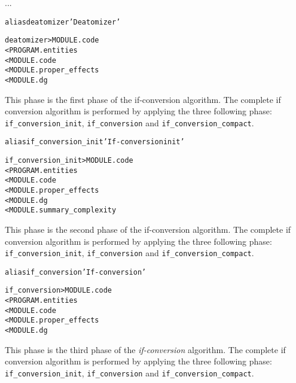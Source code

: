 \documentclass[a4paper]{report}
\newenvironment{PipsMake}{\begin{alltt}}{\end{alltt}}
\begin{document}
...

\begin{PipsMake}
alias deatomizer 'Deatomizer'

deatomizer                  > MODULE.code
        < PROGRAM.entities
        < MODULE.code
        < MODULE.proper_effects
        < MODULE.dg
\end{PipsMake}

This phase is the first phase of the if-conversion algorithm. The complete
if conversion algorithm is performed by applying the three following
phase: \verb|if_conversion_init|, \verb|if_conversion| and
\verb|if_conversion_compact|.

\begin{PipsMake}
alias if_conversion_init 'If-conversion init'

if_conversion_init                  > MODULE.code
        < PROGRAM.entities
        < MODULE.code
        < MODULE.proper_effects
        < MODULE.dg
        < MODULE.summary_complexity
\end{PipsMake}

This phase is the second phase of the if-conversion algorithm. The
complete if conversion algorithm is performed by applying the three
following phase: \verb|if_conversion_init|, \verb|if_conversion| and
\verb|if_conversion_compact|.

\begin{PipsMake}
alias if_conversion 'If-conversion'

if_conversion                  > MODULE.code
        < PROGRAM.entities
        < MODULE.code
        < MODULE.proper_effects
        < MODULE.dg
\end{PipsMake}

This phase is the third phase of the \emph{if-conversion} algorithm. The
complete if conversion algorithm is performed by applying the three
following phase: \verb|if_conversion_init|, \verb|if_conversion| and
\verb|if_conversion_compact|.
\end{document}
